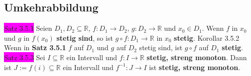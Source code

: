 \documentclass[landscape, 10pt]{article}
\newcommand{\R}{\mathbb{R}}
\begin{document}
\begin{multicols}{3}
\subsection{Umkehrabbildung}
\colorbox{magenta}{Satz 3.5.1} Seien \textcolor{NavyBlue}{$D_1,D_2\subseteq\R$, 
                $f:D_1\longrightarrow D_2,\,g:D_2\longrightarrow\R$} und 
                \textcolor{NavyBlue}{$x_0\in D_1$}.
                Wenn \textcolor{NavyBlue}{$f$} in \textcolor{NavyBlue}{$x_0$} und 
                \textcolor{NavyBlue}{$g$} in \textcolor{NavyBlue}{$f(x_0)$} 
                \textbf{stetig sind}, 
         so ist \textcolor{NavyBlue}{
                $g\circ f:D_1\longrightarrow\R$} in \textcolor{NavyBlue}{$x_0$} 
                \textbf{stetig}.
\colorbox{BurntOrange}{Korollar 3.5.2} Wenn in \textbf{Satz 3.5.1} 
                \textcolor{NavyBlue}{$f$} auf \textcolor{NavyBlue}{$D_1$} und 
                \textcolor{NavyBlue}{$g$} auf \textcolor{NavyBlue}{$D_2$}
                stetig sind, ist \textcolor{NavyBlue}{$g\circ f$} auf 
                \textcolor{NavyBlue}{$D_1$}
                \textbf{stetig}.
\colorbox{magenta}{Satz 3.5.3} Sei \textcolor{NavyBlue}{$I\subseteq\R$} 
                ein Intervall und 
                \textcolor{NavyBlue}{$f:I\longrightarrow\R$} 
                \textbf{stetig, streng monoton}. Dann ist 
                \textcolor{NavyBlue}{$J:=f(i)\subseteq\R$} ein Intervall 
         und \textcolor{NavyBlue}{$f^{-1}:J\longrightarrow I$} 
                ist \textbf{stetig, streng monoton}.

\end{multicols}
\end{document}
